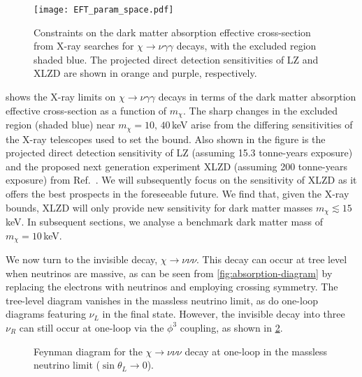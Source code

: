 \documentclass[aps, prd, reprint, nofootinbib, amsmath, amssymb, floatfix]{revtex4-2}
\begin{document}
\begin{figure}
    \texttt{[image: EFT\_param\_space.pdf]}
    \caption{\label{fig:EFT_param_space} Constraints on the dark matter absorption effective cross-section from X-ray searches for $\chi\to\nu\gamma\gamma$ decays, with the excluded region shaded blue. The projected direct detection sensitivities of LZ and XLZD are shown in orange and purple, respectively.}
\end{figure}

 shows the X-ray limits on $\chi\to\nu\gamma\gamma$ decays in terms of the dark matter absorption effective cross-section as a function of $m_\chi$. The sharp changes in the excluded region (shaded blue) near $m_\chi=10,\,40\,$keV arise from the differing sensitivities of the X-ray telescopes used to set the bound. Also shown in the figure is the projected direct detection sensitivity of LZ (assuming 15.3 tonne-years exposure) and the proposed next generation experiment XLZD (assuming 200 tonne-years exposure) from Ref.~\cite{Dror:2020czw}. We will subsequently focus on the sensitivity of XLZD as it offers the best prospects in the foreseeable future. We find that, given the X-ray bounds, XLZD will only provide new sensitivity for dark matter masses $m_\chi \lesssim 15$\,keV. In subsequent sections, we analyse a benchmark dark matter mass of $m_\chi = 10$\,keV.

We now turn to the invisible decay, $\chi\to\nu\nu\nu$. This decay can occur at tree level when neutrinos are massive, as can be seen from \cref{fig:absorption-diagram} by replacing the electrons with neutrinos and employing crossing symmetry. The tree-level diagram vanishes in the massless neutrino limit, as do one-loop diagrams featuring $\nu_L$ in the final state. However, the invisible decay into three $\nu_R$ can still occur at one-loop via the $\phi^3$ coupling, as shown in \cref{fig:FeynmanInvisibleDecay}.

\begin{figure}
    \caption{Feynman diagram for the $\chi\to\nu\nu\nu$ decay at one-loop in the massless neutrino limit ($\sin\theta_L\to0$).}
    \label{fig:FeynmanInvisibleDecay}
\end{figure}
\end{document}
